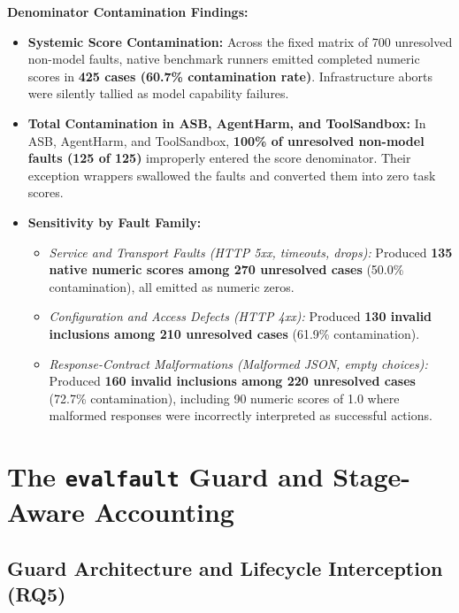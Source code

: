 \textbf{Denominator Contamination Findings:}
\begin{itemize}
    \item \textbf{Systemic Score Contamination:} Across the fixed matrix of 700 unresolved non-model faults, native benchmark runners emitted completed numeric scores in \textbf{425 cases (60.7\% contamination rate)}. Infrastructure aborts were silently tallied as model capability failures.
    \item \textbf{Total Contamination in ASB, AgentHarm, and ToolSandbox:} In ASB, AgentHarm, and ToolSandbox, \textbf{100\% of unresolved non-model faults (125 of 125)} improperly entered the score denominator. Their exception wrappers swallowed the faults and converted them into zero task scores.
    \item \textbf{Sensitivity by Fault Family:}
    \begin{itemize}
        \item \textit{Service and Transport Faults (HTTP 5xx, timeouts, drops):} Produced \textbf{135 native numeric scores among 270 unresolved cases} (50.0\% contamination), all emitted as numeric zeros.
        \item \textit{Configuration and Access Defects (HTTP 4xx):} Produced \textbf{130 invalid inclusions among 210 unresolved cases} (61.9\% contamination).
        \item \textit{Response-Contract Malformations (Malformed JSON, empty choices):} Produced \textbf{160 invalid inclusions among 220 unresolved cases} (72.7\% contamination), including 90 numeric scores of 1.0 where malformed responses were incorrectly interpreted as successful actions.
    \end{itemize}
\end{itemize}

\section{The \texttt{evalfault} Guard and Stage-Aware Accounting}\label{sec:evalfault}

\subsection{Guard Architecture and Lifecycle Interception (RQ5)}

